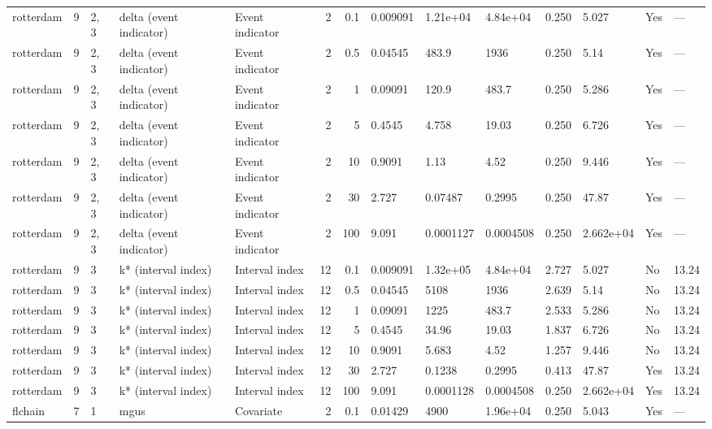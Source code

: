 \begin{tabular}{lrlllrrlllllll}
  rotterdam & 9 & 2, 3 & delta (event indicator) & Event indicator & 2 &   0.1 & 0.009091 & 1.21e+04 & 4.84e+04 & 0.250 & 5.027 & Yes & --- \\ 
  rotterdam & 9 & 2, 3 & delta (event indicator) & Event indicator & 2 &   0.5 & 0.04545 & 483.9 & 1936 & 0.250 & 5.14 & Yes & --- \\ 
  rotterdam & 9 & 2, 3 & delta (event indicator) & Event indicator & 2 &     1 & 0.09091 & 120.9 & 483.7 & 0.250 & 5.286 & Yes & --- \\ 
  rotterdam & 9 & 2, 3 & delta (event indicator) & Event indicator & 2 &     5 & 0.4545 & 4.758 & 19.03 & 0.250 & 6.726 & Yes & --- \\ 
  rotterdam & 9 & 2, 3 & delta (event indicator) & Event indicator & 2 &    10 & 0.9091 & 1.13 & 4.52 & 0.250 & 9.446 & Yes & --- \\ 
  rotterdam & 9 & 2, 3 & delta (event indicator) & Event indicator & 2 &    30 & 2.727 & 0.07487 & 0.2995 & 0.250 & 47.87 & Yes & --- \\ 
  rotterdam & 9 & 2, 3 & delta (event indicator) & Event indicator & 2 &   100 & 9.091 & 0.0001127 & 0.0004508 & 0.250 & 2.662e+04 & Yes & --- \\ 
  rotterdam & 9 & 3 & k* (interval index) & Interval index & 12 &   0.1 & 0.009091 & 1.32e+05 & 4.84e+04 & 2.727 & 5.027 & No & 13.24 \\ 
  rotterdam & 9 & 3 & k* (interval index) & Interval index & 12 &   0.5 & 0.04545 & 5108 & 1936 & 2.639 & 5.14 & No & 13.24 \\ 
  rotterdam & 9 & 3 & k* (interval index) & Interval index & 12 &     1 & 0.09091 & 1225 & 483.7 & 2.533 & 5.286 & No & 13.24 \\ 
  rotterdam & 9 & 3 & k* (interval index) & Interval index & 12 &     5 & 0.4545 & 34.96 & 19.03 & 1.837 & 6.726 & No & 13.24 \\ 
  rotterdam & 9 & 3 & k* (interval index) & Interval index & 12 &    10 & 0.9091 & 5.683 & 4.52 & 1.257 & 9.446 & No & 13.24 \\ 
  rotterdam & 9 & 3 & k* (interval index) & Interval index & 12 &    30 & 2.727 & 0.1238 & 0.2995 & 0.413 & 47.87 & Yes & 13.24 \\ 
  rotterdam & 9 & 3 & k* (interval index) & Interval index & 12 &   100 & 9.091 & 0.0001128 & 0.0004508 & 0.250 & 2.662e+04 & Yes & 13.24 \\ 
  flchain & 7 & 1 & mgus & Covariate & 2 &   0.1 & 0.01429 & 4900 & 1.96e+04 & 0.250 & 5.043 & Yes & --- \\ 

\end{tabular}
